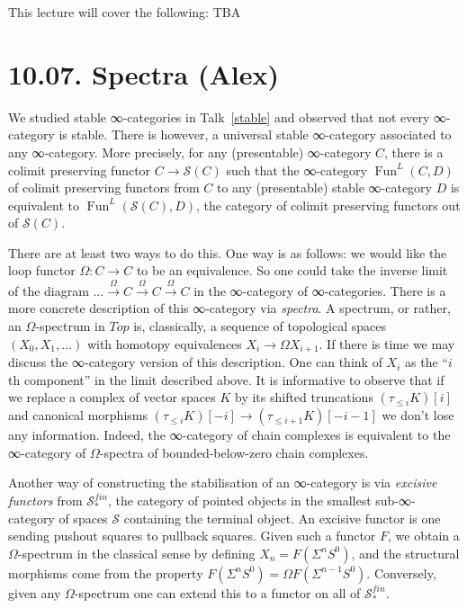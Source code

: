 \documentclass[a4paper]{amsart}
\numberwithin{figure}{section}
\theoremstyle{theorem}
\theoremstyle{definition}
\newcommand{\Top}{{Top}}
\newcommand{\Spaces}{{\mathcal{S}}}
\newcommand{\Sp}{{\mathcal{S}}}
\DeclareMathOperator{\Fun}{Fun}
\begin{document}
This lecture will cover the following: TBA


%
%
%

\section{10.07. Spectra (Alex)}

We studied stable ∞-categories in Talk~\ref{stable} and observed that not every ∞-category is stable. There is however, a universal stable ∞-category associated to any ∞-category. More precisely, for any (presentable) ∞-category $C$, there is a colimit preserving functor  $C → \Sp(C)$ such that the ∞-category $\Fun^L(C, D)$ of colimit preserving functors from $C$ to any (presentable) stable ∞-category $D$ is equivalent to $\Fun^L(\Sp(C), D)$, the category of colimit preserving functors out of $\Sp(C)$.

There are at least two ways to do this. One way is as follows: we would like the loop functor $\Omega: C \to C$ to be an equivalence. So one could take the inverse limit of the diagram $\dots \stackrel{\Omega}{\to} C \stackrel{\Omega}{\to} C \stackrel{\Omega}{\to} C$ in the ∞-category of ∞-categories. There is a more concrete description of this ∞-category via \emph{spectra}. A spectrum, or rather, an $\Omega$-spectrum in $\Top$ is, classically, a sequence of topological spaces $(X_0, X_1, \dots)$ with homotopy equivalences $X_i → \Omega X_{i+1}$. If there is time we may discuss the ∞-category version of this description. One can think of $X_i$ as the ``$i$th component'' in the limit described above. It is informative to observe that if we replace a complex of vector spaces $K$ by its shifted truncations $(\tau_{\leq i}K)[i]$ and canonical morphisms $(\tau_{\leq i}K)[{-}i] \to (\tau_{\leq {i+1}}K)[{-}i{-}1]$ we don't lose any information. Indeed, the ∞-category of chain complexes is equivalent to the ∞-category of $\Omega$-spectra of bounded-below-zero chain complexes.

Another way of constructing the stabilisation of an ∞-category is via \emph{excisive functors} from $\Spaces^{fin}_*$, the category of pointed objects in the smallest sub-∞-category of spaces $\Spaces$ containing the terminal object. An excisive functor is one sending pushout squares to pullback squares. Given such a functor $F$, we obtain a $\Omega$-spectrum in the classical sense by defining $X_n = F(\Sigma^n S^0)$, and the structural morphisms come from the property $F(\Sigma^n S^0) = \Omega F(\Sigma^{n-1} S^0)$. Conversely, given any $\Omega$-spectrum one can extend this to a functor on all of $\Spaces^{fin}_*$. 
\end{document}
